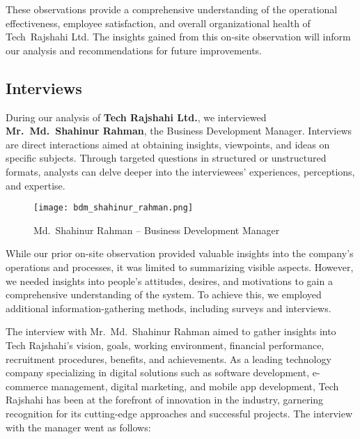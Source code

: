 \documentclass[12pt,a4paper]{article}
\begin{document}
These observations provide a comprehensive understanding of the operational effectiveness, employee satisfaction, and overall organizational health of Tech Rajshahi Ltd.  The insights gained from this on‑site observation will inform our analysis and recommendations for future improvements.

\subsection{Interviews}

During our analysis of \textbf{Tech Rajshahi Ltd.}, we interviewed \textbf{Mr.~Md.~Shahinur Rahman}, the Business Development Manager. Interviews are direct interactions aimed at obtaining insights, viewpoints, and ideas on specific subjects. Through targeted questions in structured or unstructured formats, analysts can delve deeper into the interviewees’ experiences, perceptions, and expertise.

\begin{figure}[H]
    \centering
    \texttt{[image: bdm\_shahinur\_rahman.png]}
    \caption{Md.\ Shahinur Rahman – Business Development Manager}
    \label{fig:bdm_shahinur_rahman}
\end{figure}

While our prior on-site observation provided valuable insights into the company’s operations and processes, it was limited to summarizing visible aspects. However, we needed insights into people’s attitudes, desires, and motivations to gain a comprehensive understanding of the system. To achieve this, we employed additional information-gathering methods, including surveys and interviews.

The interview with Mr.~Md.~Shahinur Rahman aimed to gather insights into Tech Rajshahi’s vision, goals, working environment, financial performance, recruitment procedures, benefits, and achievements. As a leading technology company specializing in digital solutions such as software development, e-commerce management, digital marketing, and mobile app development, Tech Rajshahi has been at the forefront of innovation in the industry, garnering recognition for its cutting-edge approaches and successful projects. The interview with the manager went as follows:

\vspace{0.3cm}
\end{document}
